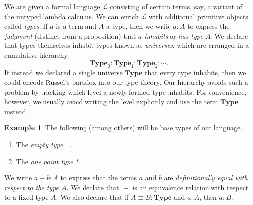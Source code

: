 \documentclass[10pt,letterpaper,cm]{nupset}
\theoremstyle{definition}
\newtheorem{exmp}[definition]{Example}
\theoremstyle{theorem}
\theoremstyle{remark}
\newcommand{\1}{\mathbf{1}}
\newcommand{\0}{\vec 0}
\begin{document}
We are given a formal language $\mathcal{L}$ consisting of certain terms, say, a variant of the untyped lambda calculus. We can enrich $\mathcal{L}$ with additional primitive objects called \textit{types}. If $a$ is a term and $A$ a type, then we write $a: A$ to express the \textit{judgment} (distinct from a proposition) that $a$ \textit{inhabits} or \textit{has type} $A$. We declare that types themselves inhabit types known as \textit{universes}, which are arranged in a cumulative hierarchy. $$\mathbf{Type}_0 :\mathbf{Type}_1 : \mathbf{Type}_2 : \cdots . $$ If instead we declared a single universe $\mathbf{Type}$ that every type inhabits, then we could encode Russel's paradox into our type theory. Our hierarchy avoids such a problem by tracking which level a newly formed type inhabits. For convenience, however, we usually avoid writing the level explicitly and use the term $\mathbf{Type}$ instead.
\begin{exmp} The following (among others) will be base types of our language.
\begin{enumerate}
\item The \textit{empty type} $\bot$.
\item The \textit{one point type} $\ast$.
\end{enumerate}
\end{exmp}
We write $a\equiv b :A$ to express that the terms $a$ and $b$ are \textit{definitionally equal with respect to the type $A$}. We declare that $\equiv$ is an equivalence relation with respect to a fixed type $A$. We also declare that if $A\equiv B : \mathbf{Type}$ and $a: A$, then $a:B$.
\end{document}
